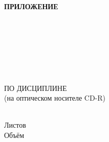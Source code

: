 \begin{ESKDtitlePage}
    \begin{flushright}
        \textbf{ПРИЛОЖЕНИЕ~\envCourseworkPrilLetter} \enspace\enspace
    \end{flushright}

    \begin{center}
        \envCourseworkEducation \\
        \envCourseworkUniversity \\
        \envCourseworkCathedra \\
    \end{center}

    \vfill

    \begin{center}
        \envCourseworkTitle \\
    \end{center}

    \vfill

    \begin{center}
        \textbf{\envCourseworkDocumentTitle} \\
        ПО ДИСЦИПЛИНЕ \envCourseworkSubject \\
        (на оптическом носителе CD-R) \\
    \end{center}

    \vfill

    \begin{center}
        \envCourseworkCode \\
        Листов \pageref{LastPage} \\
        Объём~\envCourseworkDiskSize \\
    \end{center}

    \vfill

    

    \vfill

    \begin{center}
        \ESKDtheYear
    \end{center}
\end{ESKDtitlePage}
